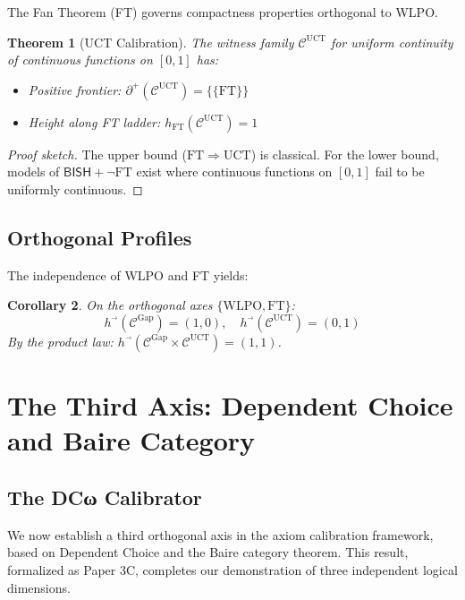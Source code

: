 \documentclass[11pt]{article}
\newtheorem{theorem}{Theorem}[section]
\newtheorem{corollary}[theorem]{Corollary}
\newcommand{\WLPO}{\mathrm{WLPO}}
\newcommand{\FT}{\mathrm{FT}}
\newcommand{\BISH}{\mathsf{BISH}}
\newcommand{\Frontierpos}{\partial^{+}}
\newcommand{\UCT}{\mathrm{UCT}}
\begin{document}
The Fan Theorem (FT) governs compactness properties orthogonal to WLPO.

\begin{theorem}[UCT Calibration]
The witness family $\mathcal{C}^{\UCT}$ for uniform continuity of continuous functions on $[0,1]$ has:
\begin{itemize}
\item Positive frontier: $\Frontierpos(\mathcal{C}^{\UCT}) = \{\{\FT\}\}$
\item Height along FT ladder: $h_{\FT}(\mathcal{C}^{\UCT}) = 1$
\end{itemize}
\end{theorem}

\begin{proof}[Proof sketch]
The upper bound ($\FT \Rightarrow \UCT$) is classical. For the lower bound, models of $\BISH + \neg\FT$ exist where continuous functions on $[0,1]$ fail to be uniformly continuous.
\end{proof}

\subsection{Orthogonal Profiles}

The independence of WLPO and FT yields:

\begin{corollary}
On the orthogonal axes $\{\WLPO, \FT\}$:
\[
h^{\vec{}}(\mathcal{C}^{\text{Gap}}) = (1, 0), \quad h^{\vec{}}(\mathcal{C}^{\UCT}) = (0, 1)
\]
By the product law: $h^{\vec{}}(\mathcal{C}^{\text{Gap}} \times \mathcal{C}^{\UCT}) = (1, 1)$.
\end{corollary}

\section{The Third Axis: Dependent Choice and Baire Category}

\subsection{The DCω Calibrator}

We now establish a third orthogonal axis in the axiom calibration framework, based on Dependent Choice and the Baire category theorem. This result, formalized as Paper 3C, completes our demonstration of three independent logical dimensions.
\end{document}
